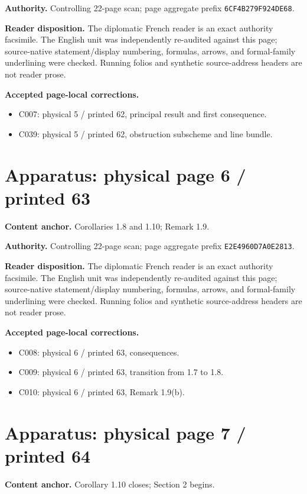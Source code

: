 \documentclass[10pt]{article}
\begin{document}
\textbf{Authority.} Controlling 22-page scan; page aggregate prefix \texttt{6CF4B279F924DE68}.

\textbf{Reader disposition.} The diplomatic French reader is an exact authority facsimile. The English unit was independently re-audited against this page; source-native statement/display numbering, formulas, arrows, and formal-family underlining were checked. Running folios and synthetic source-address headers are not reader prose.

\textbf{Accepted page-local corrections.} \begin{itemize}
\item C007: physical 5 / printed 62, principal result and first consequence.
\item C039: physical 5 / printed 62, obstruction subscheme and line bundle.
\end{itemize}
\newpage
\setcounter{footnote}{0}
\fontsize{10.2pt}{12.04pt}\selectfont
\section*{Apparatus: physical page 6 / printed 63}
\textbf{Content anchor.} Corollaries 1.8 and 1.10; Remark 1.9.

\textbf{Authority.} Controlling 22-page scan; page aggregate prefix \texttt{E2E4960D7A0E2813}.

\textbf{Reader disposition.} The diplomatic French reader is an exact authority facsimile. The English unit was independently re-audited against this page; source-native statement/display numbering, formulas, arrows, and formal-family underlining were checked. Running folios and synthetic source-address headers are not reader prose.

\textbf{Accepted page-local corrections.} \begin{itemize}
\item C008: physical 6 / printed 63, consequences.
\item C009: physical 6 / printed 63, transition from 1.7 to 1.8.
\item C010: physical 6 / printed 63, Remark 1.9(b).
\end{itemize}
\newpage
\setcounter{footnote}{0}
\fontsize{10.2pt}{12.04pt}\selectfont
\section*{Apparatus: physical page 7 / printed 64}
\textbf{Content anchor.} Corollary 1.10 closes; Section 2 begins.
\end{document}
